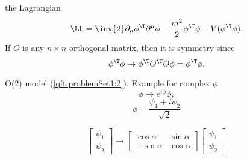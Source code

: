 the Lagrangian
\begin{dmath}\label{eqn:qftLecture6:960}
\LL = \inv{2} \partial_\mu \phi^\T \partial^\mu \phi - \frac{m^2}{2} \phi^\T \phi - V(\phi^\T \phi).
\end{dmath}
If \( O \) is any \( n \times n \) orthogonal matrix, then it is symmetry since
\begin{dmath}\label{eqn:qftLecture6:980}
\phi^\T \phi \rightarrow \phi^\T O^\T O \phi = \phi^\T \phi.
\end{dmath}

O(2) model (\cref{qft:problemSet1:2}).  Example for complex \( \phi \)
\begin{dmath}\label{eqn:qftLecture6:1000}
\phi \rightarrow e^{i \phi} \phi,
\end{dmath}
\begin{dmath}\label{eqn:qftLecture6:1020}
\phi = \frac{\psi_1 + i \psi_2}{\sqrt{2}}
\end{dmath}

\begin{dmath}\label{eqn:qftLecture6:1040}
\begin{bmatrix}
\psi_1 \\
\psi_2
\end{bmatrix}
\rightarrow
\begin{bmatrix}
\cos\alpha & \sin\alpha \\
-\sin\alpha & \cos\alpha
\end{bmatrix}
\begin{bmatrix}
\psi_1 \\
\psi_2
\end{bmatrix}
\end{dmath}

